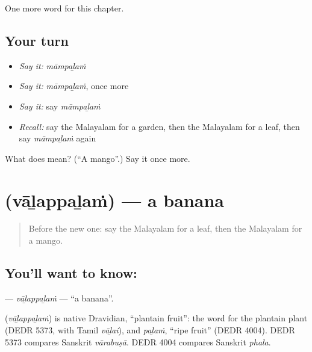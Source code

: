 \begin{grammarlens}[title={What you've built}]
One more word for this chapter.
\end{grammarlens}

\subsection*{Your turn}
\begin{itemize}
\raggedright
  \item \emph{Say it:} \emph{māmpaḻaṁ}
  \item \emph{Say it:} \emph{māmpaḻaṁ}, once more
  \item \emph{Say it:} say \emph{māmpaḻaṁ}
  \item \emph{Recall:} say the Malayalam for a garden, then the Malayalam for a leaf, then say \emph{māmpaḻaṁ} again
\end{itemize}

\begin{tcolorbox}[breakable,colback=teal!4,colframe=teal!35!black,title={Before you move on}]
What does  mean? (\textquotedblleft{}A mango\textquotedblright{}.) Say it once more.
\end{tcolorbox}
\section[\texorpdfstring{\ml{വാഴപ്പഴം} (vāḻappaḻaṁ)}{വാഴപ്പഴം (vāḻappaḻaṁ)}]{ (vāḻappaḻaṁ) — a banana}

\label{lesson:ML-C149-valappalam}



\begin{quote}
Before the new one: say the Malayalam for a leaf, then the Malayalam for a mango.
\end{quote}

\subsection*{You'll want to know: }
\textbf{} — \emph{vāḻappaḻaṁ} — \textquotedblleft{}a banana\textquotedblright{}.

\begin{cousinweb}
\textbf{} (\emph{vāḻappaḻaṁ}) is native Dravidian, \textquotedblleft{}plantain fruit\textquotedblright{}: the word for the plantain plant (DEDR 5373, with Tamil \emph{vāḻai}), and \emph{paḻaṁ}, \textquotedblleft{}ripe fruit\textquotedblright{} (DEDR 4004). DEDR 5373 compares Sanskrit \emph{vārabuṣā}. DEDR 4004 compares Sanskrit \emph{phala}.
\end{cousinweb}

